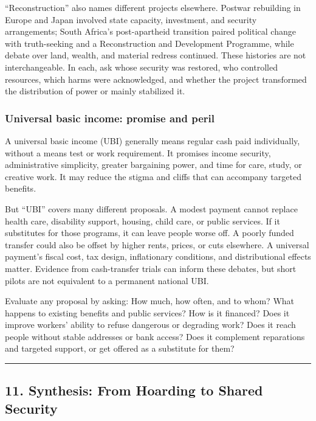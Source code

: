 \documentclass[
  11pt,
  letterpaper,
]{article}
\begin{document}
``Reconstruction'' also names different projects elsewhere. Postwar
rebuilding in Europe and Japan involved state capacity, investment, and
security arrangements; South Africa's post-apartheid transition paired
political change with truth-seeking and a Reconstruction and Development
Programme, while debate over land, wealth, and material redress
continued. These histories are not interchangeable. In each, ask whose
security was restored, who controlled resources, which harms were
acknowledged, and whether the project transformed the distribution of
power or mainly stabilized it.

\subsubsection{Universal basic income: promise and
peril}\label{universal-basic-income-promise-and-peril}

A universal basic income (UBI) generally means regular cash paid
individually, without a means test or work requirement. It promises
income security, administrative simplicity, greater bargaining power,
and time for care, study, or creative work. It may reduce the stigma and
cliffs that can accompany targeted benefits.

But ``UBI'' covers many different proposals. A modest payment cannot
replace health care, disability support, housing, child care, or public
services. If it substitutes for those programs, it can leave people
worse off. A poorly funded transfer could also be offset by higher
rents, prices, or cuts elsewhere. A universal payment's fiscal cost, tax
design, inflationary conditions, and distributional effects matter.
Evidence from cash-transfer trials can inform these debates, but short
pilots are not equivalent to a permanent national UBI.

Evaluate any proposal by asking: How much, how often, and to whom? What
happens to existing benefits and public services? How is it financed?
Does it improve workers' ability to refuse dangerous or degrading work?
Does it reach people without stable addresses or bank access? Does it
complement reparations and targeted support, or get offered as a
substitute for them?

\begin{center}\rule{0.5\linewidth}{0.5pt}\end{center}

\subsection{11. Synthesis: From Hoarding to Shared
Security}\label{synthesis-from-hoarding-to-shared-security}
\end{document}
